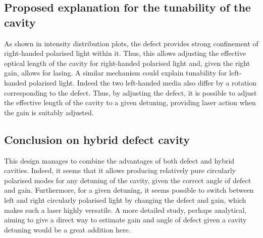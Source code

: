 \begin{figure}
\end{figure}

\subsection{Proposed explanation for the tunability of the cavity}

As shown in intensity distribution plots, the defect provides strong confinement of right-handed polarised light within it. Thus, this allows adjusting the effective optical length of the cavity for right-handed polarised light and, given the right gain, allows for lasing. A similar mechanism could explain tunability for left-handed polarised light. Indeed the two left-handed media also differ by a rotation corresponding to the defect. Thus, by adjusting the defect, it is possible to adjust the effective length of the cavity to a given detuning, providing laser action when the gain is suitably adjusted.

\subsection{Conclusion on hybrid defect cavity}
This design manages to combine the advantages of both defect and hybrid cavities. Indeed, it seems that it allows producing relatively pure circularly polarised modes for any detuning of the cavity, given the correct angle of defect and gain. Furthermore, for a given detuning, it seems possible to switch between left and right circularly polarised light by changing the defect and gain, which makes such a laser highly versatile. A more detailed study, perhaps analytical, aiming to give a direct way to estimate gain and angle of defect given a cavity detuning would be a great addition here.
